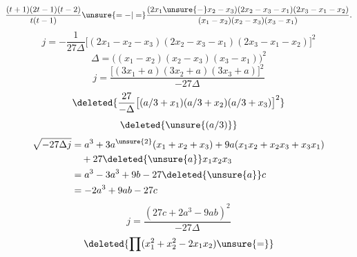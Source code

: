 
\[
\frac{(t+1)(2t-1)(t-2)}{t(t-1)}\unsure{=-|=}\frac{(2x_1\unsure{-}x_2-x_3)(2x_2-x_3-x_1)(2x_3-x_1-x_2)}{(x_1-x_2)(x_2-x_3)(x_3-x_1)}.
\]
\[
\boxed{j=-\frac1{27\Delta}\bigl[(2x_1-x_2-x_3)(2x_2-x_3-x_1)(2x_3-x_1-x_2)\bigr]^2}
\]
\margin{\[
\sum x_1=-a\qquad\sum x_1x_2=b\qquad x_1x_2x_3=\unsure{-}c
\]}
\[
\Delta=\bigl((x_1-x_2)(x_2-x_3)(x_3-x_1)\bigr)^2
\]
\[
j=\frac{\bigl[(3x_1+a)(3x_2+a)(3x_3+a)\bigr]^2}{-27\Delta}
\]
\[
\deleted{\frac{27}{-\Delta}\bigl[(a/3+x_1)(a/3+x_2)(a/3+x_3)\bigr]^2}
\]
\[
\deleted{\unsure{(a/3)}}
\]
\[
\begin{aligned}
\sqrt{-27\Delta j}&=a^3+3a^{\unsure{2}}(x_1+x_2+x_3)+9a(x_1x_2+x_2x_3+x_3x_1)\\
&\quad+27\deleted{\unsure{a}}x_1x_2x_3\\
&=a^3-3a^3+9b-27\deleted{\unsure{a}}c\\
&=-2a^3+9ab-27c
\end{aligned}
\]
\[
\boxed{j=\frac{(27c+2a^3-9ab)^2}{-27\Delta}}
\]
\[
\deleted{\prod(x_1^2+x_2^2-2x_1x_2)\unsure{=}}
\]
